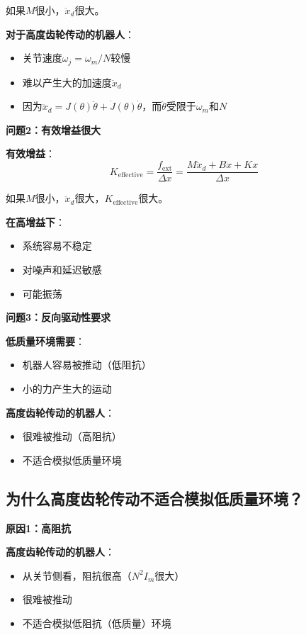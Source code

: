 \documentclass[12pt,a4paper]{article}
\begin{document}
如果$M$很小，$\ddot{x}_d$很大。

\textbf{对于高度齿轮传动的机器人}：
\begin{itemize}
\item 关节速度$\omega_j = \omega_m/N$较慢
\item 难以产生大的加速度$\ddot{x}_d$
\item 因为$\ddot{x}_d = J(\theta)\ddot{\theta} + \dot{J}(\theta)\dot{\theta}$，而$\ddot{\theta}$受限于$\omega_m$和$N$
\end{itemize}

\textbf{问题2：有效增益很大}

\textbf{有效增益}：
\begin{equation}
K_{\text{effective}} = \frac{f_{\text{ext}}}{\Delta x} = \frac{M\ddot{x}_d + B\dot{x} + Kx}{\Delta x}
\end{equation}

如果$M$很小，$\ddot{x}_d$很大，$K_{\text{effective}}$很大。

\textbf{在高增益下}：
\begin{itemize}
\item 系统容易不稳定
\item 对噪声和延迟敏感
\item 可能振荡
\end{itemize}

\textbf{问题3：反向驱动性要求}

\textbf{低质量环境需要}：
\begin{itemize}
\item 机器人容易被推动（低阻抗）
\item 小的力产生大的运动
\end{itemize}

\textbf{高度齿轮传动的机器人}：
\begin{itemize}
\item 很难被推动（高阻抗）
\item 不适合模拟低质量环境
\end{itemize}

\subsection{为什么高度齿轮传动不适合模拟低质量环境？}

\textbf{原因1：高阻抗}

\textbf{高度齿轮传动的机器人}：
\begin{itemize}
\item 从关节侧看，阻抗很高（$N^2 I_m$很大）
\item 很难被推动
\item 不适合模拟低阻抗（低质量）环境
\end{itemize}
\end{document}
